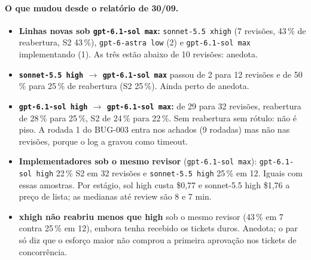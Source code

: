 \documentclass[11pt,a4paper]{article}
\begin{document}
\medskip
{}

\paragraph{O que mudou desde o relatório de 30/09.}
\begin{itemize}
  \item \textbf{Linhas novas sob \texttt{gpt-6.1-sol max}:} \texttt{sonnet-5.5
        xhigh} (7 revisões, 43\,\% de reabertura, S2 43\,\%),
        \texttt{gpt-6-astra low} (2) e \texttt{gpt-6.1-sol max} implementando
        (1). As três estão abaixo de 10 revisões: anedota.
  \item \textbf{\texttt{sonnet-5.5 high} $\to$ \texttt{gpt-6.1-sol max}}
        passou de 2 para 12 revisões e de 50\,\% para 25\,\% de reabertura (S2
        25\,\%). Ainda perto de anedota.
  \item \textbf{\texttt{gpt-6.1-sol high} $\to$ \texttt{gpt-6.1-sol max}:} de
        29 para 32 revisões, reabertura de 28\,\% para 25\,\%, S2 de 24\,\% para
        22\,\%. Sem reabertura sem rótulo: não é piso. A rodada 1 do BUG-003
        entra nos achados (9 rodadas) mas não nas revisões, porque o log a
        gravou como timeout.
  \item \textbf{Implementadores sob o mesmo revisor} (\texttt{gpt-6.1-sol
        max}): \texttt{gpt-6.1-sol high} 22\,\% S2 em 32 revisões e
        \texttt{sonnet-5.5 high} 25\,\% em 12. Iguais com essas amostras. Por
        estágio, sol high custa \$0,77 e sonnet-5.5 high \$1,76 a preço de
        lista; as medianas até review são 8 e 7 min.
  \item \textbf{xhigh não reabriu menos que high} sob o mesmo revisor (43\,\%
        em 7 contra 25\,\% em 12), embora tenha recebido os tickets duros.
        Anedota; o par só diz que o esforço maior não comprou a primeira
        aprovação nos tickets de concorrência.
\end{itemize}
\end{document}
